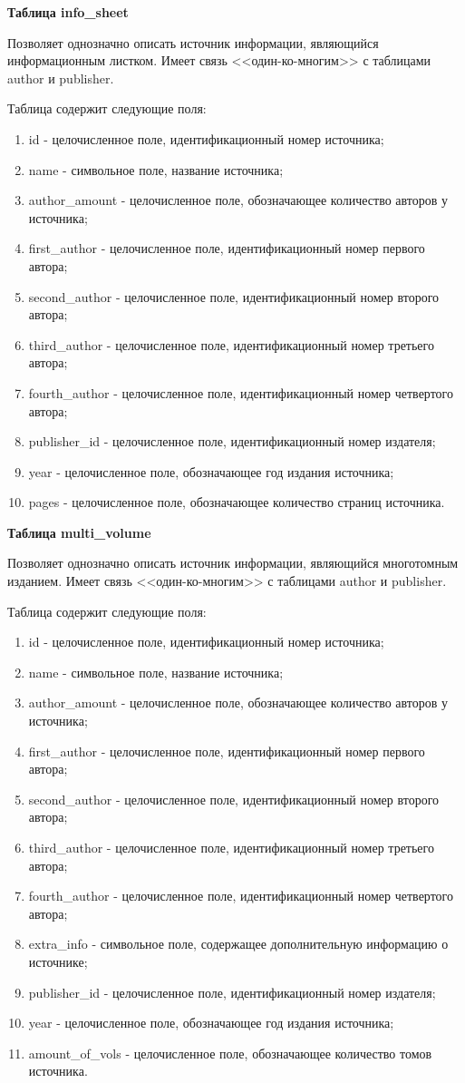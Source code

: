 {\bf Таблица info\_sheet}

Позволяет однозначно описать источник информации, являющийся информационным листком. Имеет связь <<один-ко-многим>> с таблицами author и publisher. 


Таблица содержит следующие поля:
\begin{enumerate}
	\item id - целочисленное поле, идентификационный номер источника;
	\item name - символьное поле, название источника;
	\item author\_amount - целочисленное поле, обозначающее количество авторов у источника;
	\item first\_author - целочисленное поле, идентификационный номер первого автора;
	\item second\_author - целочисленное поле, идентификационный номер второго автора;
	\item third\_author - целочисленное поле, идентификационный номер третьего автора;
	\item fourth\_author - целочисленное поле, идентификационный номер четвертого автора;
	\item publisher\_id - целочисленное поле, идентификационный номер издателя;
	\item year - целочисленное поле, обозначающее год издания источника;
	\item pages - целочисленное поле, обозначающее количество страниц источника.
\end{enumerate}
\hfill \break

{\bf Таблица multi\_volume}

Позволяет однозначно описать источник информации, являющийся многотомным изданием. Имеет связь <<один-ко-многим>> с таблицами author и publisher. 


Таблица содержит следующие поля:
\begin{enumerate}
	\item id - целочисленное поле, идентификационный номер источника;
	\item name - символьное поле, название источника;
	\item author\_amount - целочисленное поле, обозначающее количество авторов у источника;
	\item first\_author - целочисленное поле, идентификационный номер первого автора;
	\item second\_author - целочисленное поле, идентификационный номер второго автора;
	\item third\_author - целочисленное поле, идентификационный номер третьего автора;
	\item fourth\_author - целочисленное поле, идентификационный номер четвертого автора;
	\item extra\_info - символьное поле, содержащее дополнительную информацию о источнике;
	\item publisher\_id - целочисленное поле, идентификационный номер издателя;
	\item year - целочисленное поле, обозначающее год издания источника;
	\item amount\_of\_vols - целочисленное поле, обозначающее количество томов источника.
\end{enumerate}

